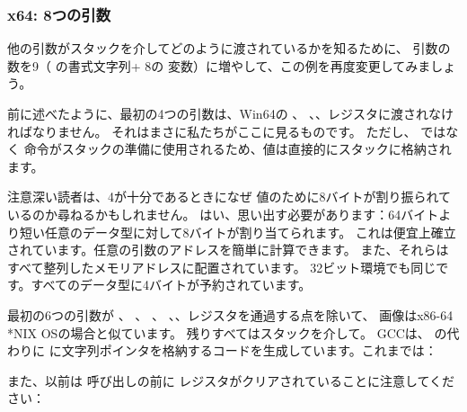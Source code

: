 \subsubsection{x64: 8つの引数}

\label{example_printf8_x64}
他の引数がスタックを介してどのように渡されているかを知るために、
引数の数を9（ \printf の書式文字列+ 8の \Tint 変数）に増やして、この例を再度変更してみましょう。




前に述べたように、最初の4つの引数は、Win64の \RCX 、 \RDX 、、レジスタに渡されなければなりません。 
それはまさに私たちがここに見るものです。 
ただし、 \PUSH ではなく \MOV 命令がスタックの準備に使用されるため、値は直接的にスタックに格納されます。



注意深い読者は、4が十分であるときになぜ \Tint 値のために8バイトが割り振られているのか尋ねるかもしれません。
はい、思い出す必要があります：64バイトより短い任意のデータ型に対して8バイトが割り当てられます。 
これは便宜上確立されています。任意の引数のアドレスを簡単に計算できます。 
また、それらはすべて整列したメモリアドレスに配置されています。 
32ビット環境でも同じです。すべてのデータ型に4バイトが予約されています。



最初の6つの引数が \RDI 、 \RSI 、 \RDX 、 \RCX 、、レジスタを通過する点を除いて、
画像はx86-64 *NIX OSの場合と似ています。 
残りすべてはスタックを介して。
GCCは、 \RDI{} の代わりに \EDI に文字列ポインタを格納するコードを生成しています。これまでは：

また、以前は \printf 呼び出しの前に \EAX レジスタがクリアされていることに注意してください：




